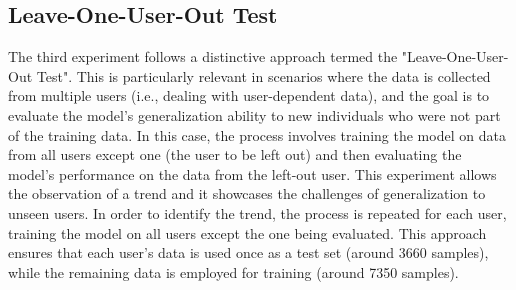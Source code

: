 
\subsection{Leave-One-User-Out Test}
The third experiment follows a distinctive approach termed the "Leave-One-User-Out Test". This is particularly relevant in scenarios where the data is collected from multiple users (i.e., dealing with user-dependent data), and the goal is to evaluate the model's generalization ability to new individuals who were not part of the training data. In this case, the process involves training the model on data from all users except one (the user to be left out) and then evaluating the model's performance on the data from the left-out user. This experiment allows the observation of a trend and it showcases the challenges of generalization to unseen users. In order to identify the trend, the process is repeated for each user, training the model on all users except the one being evaluated. This approach ensures that each user's data is used once as a test set (around 3660 samples), while the remaining data is employed for training (around 7350 samples).


